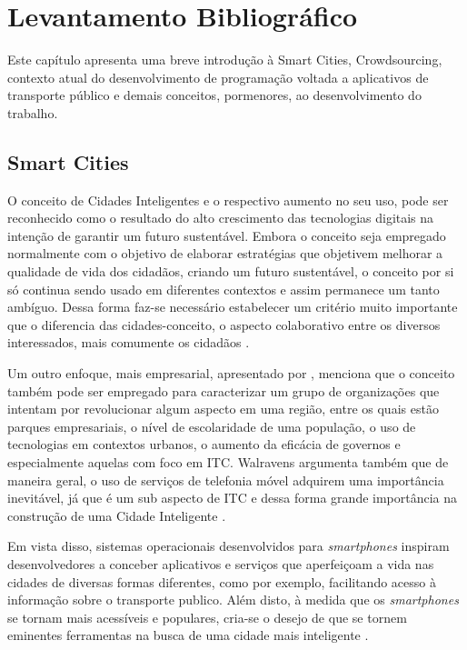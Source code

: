 \chapter{Levantamento Bibliográfico}\label{cap:levbibliog}

Este capítulo apresenta uma breve introdução à Smart Cities, Crowdsourcing, contexto atual do desenvolvimento de programação voltada a aplicativos de transporte público e demais conceitos, pormenores, ao desenvolvimento do trabalho.

\section{Smart Cities}

O conceito de Cidades Inteligentes e o respectivo aumento no seu uso, pode ser reconhecido como o resultado do alto crescimento das tecnologias digitais na intenção de garantir um futuro sustentável. Embora o conceito seja empregado normalmente com o objetivo de elaborar estratégias que objetivem melhorar a qualidade de vida dos cidadãos, criando um futuro sustentável, o conceito por si só continua sendo usado em diferentes contextos e assim permanece um tanto ambíguo. Dessa forma faz-se necessário estabelecer um critério muito importante que o diferencia das cidades-conceito, o aspecto colaborativo entre os diversos interessados, mais comumente os cidadãos \cite{schuurman}. 

Um outro enfoque, mais empresarial, apresentado por , menciona que o conceito também pode ser empregado para caracterizar um grupo de organizações que intentam por revolucionar algum aspecto em uma região, entre os quais estão parques empresariais, o nível de escolaridade de uma população, o uso de tecnologias em contextos urbanos, o aumento da eficácia de governos e especialmente aquelas com foco em ITC. Walravens argumenta também que de maneira geral, o uso de serviços de telefonia móvel adquirem uma importância inevitável, já que é um sub aspecto de ITC e dessa forma grande importância na construção de uma Cidade Inteligente \cite{walravens}.

Em vista disso, sistemas operacionais desenvolvidos para \emph{smartphones} inspiram desenvolvedores a conceber aplicativos e serviços que aperfeiçoam a vida nas cidades de diversas formas diferentes, como por exemplo, facilitando acesso à informação sobre o transporte publico. Além disto, à medida que os \emph{smartphones} se tornam mais acessíveis e populares, cria-se o desejo de que se tornem eminentes ferramentas na busca de uma cidade mais inteligente \cite{walravens}.




